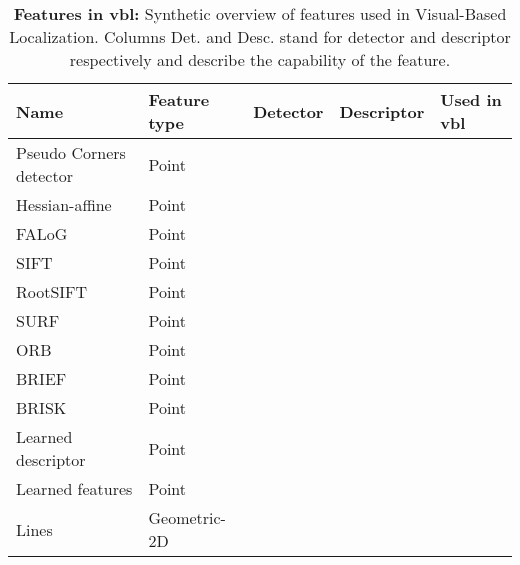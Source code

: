 \begin{landscape}
\begin{table}[t]
	\centering
	\caption[Features in \ac{vbl}]{\label{tab:features_list} \textbf{Features in \ac{vbl}:} Synthetic overview of features used in Visual-Based Localization. Columns Det. and Desc. stand for detector and descriptor respectively and describe the capability of the feature.}
	\renewcommand{\arraystretch}{1.1}
	\scriptsize{
		\begin{tabular}{l l c c l}
			\hline
			\textbf{Name} 			& \textbf{Feature type} 	& \textbf{Detector} 		& \textbf{Descriptor} 		& \textbf{Used in \ac{vbl}}\\
			\hline
			\hline
			Pseudo Corners detector \citep{Morago2015}		& Point			& \cmark	& \xmark		& \citep{Morago2015,Morago2016} \\
			Hessian-affine \citep{Mikolajczyk2004}			& Point 		& \cmark	& \xmark		& \citep{Jegou2009,Arandjelovic2012,Li2015,Sattler2016,Arandjelovic2014} \\
			FALoG \citep{Wang2013frif}		& Point			& \cmark	& \xmark		& \citep{Feng2016a} \\
			SIFT \citep{Lowe2004} 			& Point 		& \cmark	& \cmark		&  \citep{Song2016,Schindler2007,Liang2013,Zamir2010,Zamir2014,Nister2006,Yan2016} \\
            RootSIFT \citep{Arandjelovic2013}	& Point 		& \xmark	& \cmark		& \citep{Torii2013,Middelberg2014,Arandjelovic2014,Sattler2016,Torii2015}\\
			SURF \citep{Bay2006} 			& Point 		& \cmark	& \cmark		& \citep{Cummins2008,Li2015,Stumm2015a,Qu2016,Song2016,Valgren2010} \\
			ORB \citep{Rublee2011} 			& Point 		& \cmark	& \cmark		& \citep{Griffith2017} \\
			BRIEF \citep{Calonder2010} & Point		& \xmark	& \cmark		& \citep{Krajnik2014,Krajnik2017a} \\
			BRISK \citep{Leutenegger2011brisk} & Point		& \cmark	& \cmark		& \citep{Feng2016a,Middelberg2014,Muhlfellner2015} \\
			Learned descriptor & Point		& \xmark	& \cmark		& \citep{Carlevaris-Bianco2014,Paulin2015,Krajnik2017a,Piasco2019a,Taira2018} \\
			Learned features & Point		& \cmark	& \cmark		& \citep{Sarlin2018a,Dusmanu2019,Noh2017} \\
			\hline
			Lines \citep{VC1962}				& Geometric-2D		& \cmark	& \xmark		& \citep{Hays2008,Arth2015,Morago2016,Ramalingam2011} \\

\end{tabular}}
\end{table}
\end{landscape}
